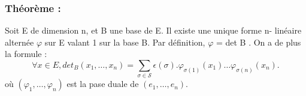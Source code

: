 \documentclass[a4paper,12pt]{article}
\begin{document}
\subsubsection{\textbf{Théorème :}}
Soit E de dimension n, et B une base de E. Il existe une unique forme n-
linéaire alternée $\varphi$ sur E valant 1 sur la base B. Par déﬁnition, $\varphi$ = det B . On a de plus la
formule :
\begin{equation}\forall x \in E, det_B(x_1,\hdots,x_n)=\sum_{\sigma \in \mathcal{S}} 
\epsilon (\sigma).\varphi_{\sigma(1)}(x_1)\hdots \varphi_{\sigma(n)}(x_n).\end{equation}
où $(\varphi_1,\hdots,\varphi_n)$ est la pase duale de $(e_1,\hdots,e_n)$.
\end{document}
